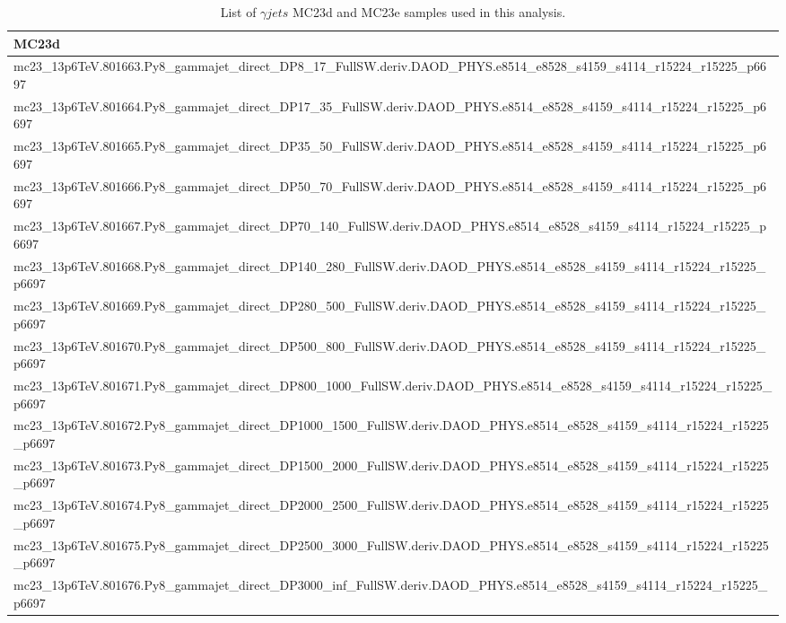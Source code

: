 \begin{table}[ht]
\centering
\scriptsize
\caption{List of $\gamma jets$ MC23d and MC23e samples used in this analysis.}
\label{tab:gammajet-samples}
\begin{tabular}{l}
\toprule
MC23d \\
\midrule
mc23\_13p6TeV.801663.Py8\_gammajet\_direct\_DP8\_17\_FullSW.deriv.DAOD\_PHYS.e8514\_e8528\_s4159\_s4114\_r15224\_r15225\_p6697\\
mc23\_13p6TeV.801664.Py8\_gammajet\_direct\_DP17\_35\_FullSW.deriv.DAOD\_PHYS.e8514\_e8528\_s4159\_s4114\_r15224\_r15225\_p6697\\
mc23\_13p6TeV.801665.Py8\_gammajet\_direct\_DP35\_50\_FullSW.deriv.DAOD\_PHYS.e8514\_e8528\_s4159\_s4114\_r15224\_r15225\_p6697\\
mc23\_13p6TeV.801666.Py8\_gammajet\_direct\_DP50\_70\_FullSW.deriv.DAOD\_PHYS.e8514\_e8528\_s4159\_s4114\_r15224\_r15225\_p6697\\
mc23\_13p6TeV.801667.Py8\_gammajet\_direct\_DP70\_140\_FullSW.deriv.DAOD\_PHYS.e8514\_e8528\_s4159\_s4114\_r15224\_r15225\_p6697\\
mc23\_13p6TeV.801668.Py8\_gammajet\_direct\_DP140\_280\_FullSW.deriv.DAOD\_PHYS.e8514\_e8528\_s4159\_s4114\_r15224\_r15225\_p6697\\
mc23\_13p6TeV.801669.Py8\_gammajet\_direct\_DP280\_500\_FullSW.deriv.DAOD\_PHYS.e8514\_e8528\_s4159\_s4114\_r15224\_r15225\_p6697\\
mc23\_13p6TeV.801670.Py8\_gammajet\_direct\_DP500\_800\_FullSW.deriv.DAOD\_PHYS.e8514\_e8528\_s4159\_s4114\_r15224\_r15225\_p6697\\
mc23\_13p6TeV.801671.Py8\_gammajet\_direct\_DP800\_1000\_FullSW.deriv.DAOD\_PHYS.e8514\_e8528\_s4159\_s4114\_r15224\_r15225\_p6697\\
mc23\_13p6TeV.801672.Py8\_gammajet\_direct\_DP1000\_1500\_FullSW.deriv.DAOD\_PHYS.e8514\_e8528\_s4159\_s4114\_r15224\_r15225\_p6697\\
mc23\_13p6TeV.801673.Py8\_gammajet\_direct\_DP1500\_2000\_FullSW.deriv.DAOD\_PHYS.e8514\_e8528\_s4159\_s4114\_r15224\_r15225\_p6697\\
mc23\_13p6TeV.801674.Py8\_gammajet\_direct\_DP2000\_2500\_FullSW.deriv.DAOD\_PHYS.e8514\_e8528\_s4159\_s4114\_r15224\_r15225\_p6697\\
mc23\_13p6TeV.801675.Py8\_gammajet\_direct\_DP2500\_3000\_FullSW.deriv.DAOD\_PHYS.e8514\_e8528\_s4159\_s4114\_r15224\_r15225\_p6697\\
mc23\_13p6TeV.801676.Py8\_gammajet\_direct\_DP3000\_inf\_FullSW.deriv.DAOD\_PHYS.e8514\_e8528\_s4159\_s4114\_r15224\_r15225\_p6697\\

\end{tabular}
\end{table}
